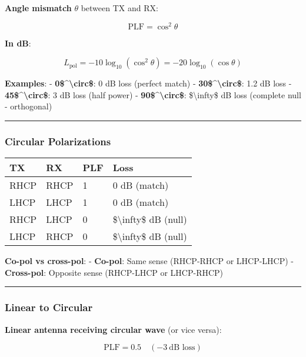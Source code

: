 \textbf{Angle mismatch} \(\theta\) between TX and RX:

\[
\text{PLF} = \cos^2\theta
\]

\textbf{In dB}:

\[
L_{\text{pol}} = -10\log_{10}(\cos^2\theta) = -20\log_{10}(\cos\theta)
\]

\textbf{Examples}: - \textbf{0\$\^{}\textbackslash circ\$}: 0 dB loss
(perfect match) - \textbf{30\$\^{}\textbackslash circ\$}: 1.2 dB loss -
\textbf{45\$\^{}\textbackslash circ\$}: 3 dB loss (half power) -
\textbf{90\$\^{}\textbackslash circ\$}: \$\textbackslash infty\$ dB loss
(complete null - orthogonal)

\begin{center}\rule{0.5\linewidth}{0.5pt}\end{center}

\subsubsection{Circular Polarizations}\label{circular-polarizations}

{\def\LTcaptype{} %
\begin{longtable}[]{@{}llll@{}}
\toprule\noalign{}
TX & RX & PLF & Loss \\
\midrule\noalign{}
\endhead
\bottomrule\noalign{}
\endlastfoot
RHCP & RHCP & 1 & 0 dB (match) \\
LHCP & LHCP & 1 & 0 dB (match) \\
RHCP & LHCP & 0 & \$\textbackslash infty\$ dB (null) \\
LHCP & RHCP & 0 & \$\textbackslash infty\$ dB (null) \\
\end{longtable}
}

\textbf{Co-pol vs cross-pol}: - \textbf{Co-pol}: Same sense (RHCP-RHCP
or LHCP-LHCP) - \textbf{Cross-pol}: Opposite sense (RHCP-LHCP or
LHCP-RHCP)

\begin{center}\rule{0.5\linewidth}{0.5pt}\end{center}

\subsubsection{Linear to Circular}\label{linear-to-circular}

\textbf{Linear antenna receiving circular wave} (or vice versa):

\[
\text{PLF} = 0.5 \quad (-3\ \text{dB loss})
\]

